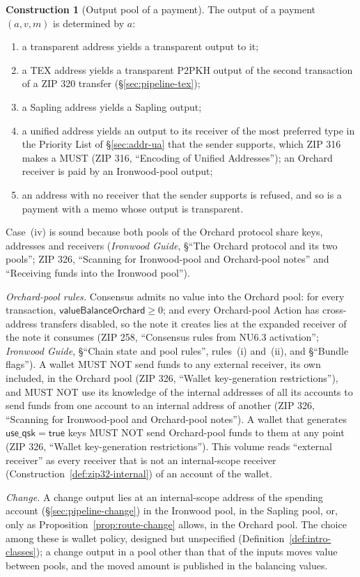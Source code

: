 \documentclass[11pt,a4paper]{article}
\theoremstyle{definition}
\newtheorem{construction}[theorem]{Construction}
\begin{document}
\begin{construction}[Output pool of a payment]\label{def:route}
The output of a payment $(a, v, m)$ is determined by $a$:
\begin{enumerate}[label=(\roman*)]
\item a transparent address yields a transparent output to it;
\item a TEX address yields a transparent P2PKH output of the second
  transaction of a ZIP 320 transfer (\S\ref{sec:pipeline-tex});
\item a Sapling address yields a Sapling output;
\item a unified address yields an output to its receiver of the most
  preferred type in the Priority List of \S\ref{sec:addr-ua} that the sender
  supports, which ZIP 316 makes a MUST (ZIP 316, ``Encoding of Unified
  Addresses''); an Orchard receiver is paid by an Ironwood-pool output;
\item an address with no receiver that the sender supports is refused, and
  so is a payment with a memo whose output is transparent.
\end{enumerate}
Case~(iv) is sound because both pools of the Orchard protocol share keys,
addresses and receivers (\emph{Ironwood Guide}, \S``The Orchard protocol and
its two pools''; ZIP 326, ``Scanning for Ironwood-pool and Orchard-pool
notes'' and ``Receiving funds into the Ironwood pool'').

\emph{Orchard-pool rules.} Consensus admits no value into the Orchard pool:
for every transaction, $\mathsf{valueBalanceOrchard} \ge 0$; and every
Orchard-pool Action has cross-address transfers disabled, so the note it creates
lies at the expanded receiver of the note it consumes (ZIP 258, ``Consensus
rules from NU6.3 activation''; \emph{Ironwood Guide}, \S``Chain state and pool
rules'', rules~(i) and~(ii), and \S``Bundle flags''). A wallet MUST NOT send
funds to any external receiver, its own included, in the Orchard pool (ZIP 326,
``Wallet key-generation restrictions''), and MUST NOT use its knowledge of the
internal addresses of all its accounts to send funds from one account to an
internal address of another (ZIP 326, ``Scanning for Ironwood-pool and
Orchard-pool notes''). A wallet that generates $\mathsf{use\_qsk} =
\mathsf{true}$ keys MUST NOT send Orchard-pool funds to them at any point
(ZIP 326, ``Wallet key-generation restrictions''). This volume reads ``external
receiver'' as every receiver
that is not an internal-scope receiver (Construction~\ref{def:zip32-internal})
of an account of the wallet.

\emph{Change.} A change output lies at an internal-scope address of the
spending account (\S\ref{sec:pipeline-change}) in the Ironwood pool, in the
Sapling pool, or, only as Proposition~\ref{prop:route-change} allows, in the
Orchard pool. The choice among these is wallet policy, designed but
unspecified (Definition~\ref{def:intro-classes}); a change output in a pool
other than that of the inputs moves value between pools, and the moved
amount is published in the balancing values.
\end{construction}
\end{document}
